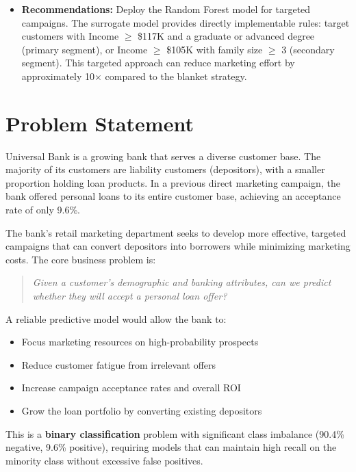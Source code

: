\documentclass[11pt, a4paper]{article}
\begin{document}
\begin{itemize}[leftmargin=*, itemsep=4pt]
    \item \textbf{Recommendations:} Deploy the Random Forest model for targeted
          campaigns. The surrogate model provides directly implementable rules:
          target customers with Income $\geq$ \$117K and a graduate or advanced
          degree (primary segment), or Income $\geq$ \$105K with family size
          $\geq$ 3 (secondary segment). This targeted approach can reduce
          marketing effort by approximately 10$\times$ compared to the blanket
          strategy.
\end{itemize}

\section{Problem Statement}

Universal Bank is a growing bank that serves a diverse customer base. The
majority of its customers are liability customers (depositors), with a smaller
proportion holding loan products. In a previous direct marketing campaign, the
bank offered personal loans to its entire customer base, achieving an acceptance
rate of only 9.6\%.

The bank's retail marketing department seeks to develop more effective,
targeted campaigns that can convert depositors into borrowers while minimizing
marketing costs. The core business problem is:

\begin{quote}
\textit{Given a customer's demographic and banking attributes, can we predict
whether they will accept a personal loan offer?}
\end{quote}

A reliable predictive model would allow the bank to:
\begin{itemize}[itemsep=2pt]
    \item Focus marketing resources on high-probability prospects
    \item Reduce customer fatigue from irrelevant offers
    \item Increase campaign acceptance rates and overall ROI
    \item Grow the loan portfolio by converting existing depositors
\end{itemize}

This is a \textbf{binary classification} problem with significant class
imbalance (90.4\% negative, 9.6\% positive), requiring models that can
maintain high recall on the minority class without excessive false positives.
\end{document}
